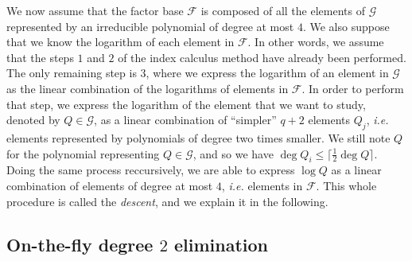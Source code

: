 \documentclass[a4paper,11pt]{article}
\theoremstyle{break}
\theoremstyle{sc}
\theoremstyle{definition}
\theoremstyle{remark}
\newcommand{\ie}{\emph{i.e. }}
\begin{document}
We now assume that the factor base $\mathcal F$ is composed of all the
elements of $\mathcal G$ represented by an irreducible polynomial of degree at
most $4$. We also suppose that we know the logarithm of each element in
$\mathcal F$. In other words, we assume that the steps $1$ and $2$ of the index
calculus method have already been performed. The only remaining step is $3$,
where we express the logarithm of an element in $\mathcal G$ as the linear
combination of the logarithms of elements in $\mathcal F$. In order to perform
that step, we express the logarithm of the element that we want to study, denoted by
$Q\in\mathcal G$, as a linear combination of ``simpler'' $q+2$ elements $Q_j$,
\ie elements represented by polynomials of degree two times smaller. We
still note $Q$ for the polynomial representing $Q\in
\mathcal G$, and so we have $\deg Q_i\leq \lceil \frac{1}{2}\deg Q\rceil$. Doing
the same process reccursively, we are able to express $\log Q$ as a linear
combination of elements of degree at most $4$, \ie elements in $\mathcal F$.
This whole procedure is called the \emph{descent}, and we explain it in the
following. 

\subsection{On-the-fly degree $2$ elimination}
\end{document}
